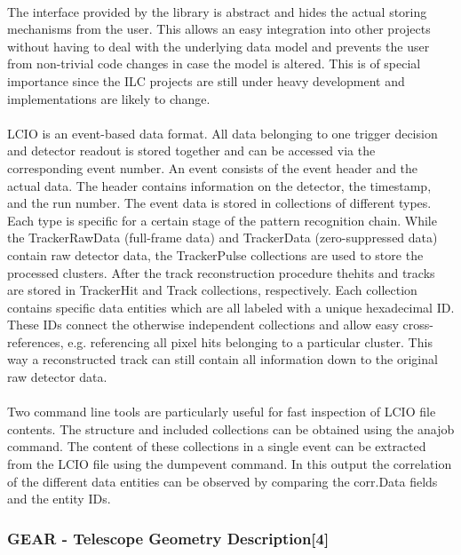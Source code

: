 \documentclass[11pt]{article}
\begin{document}
\paragraph{}
The interface provided by the library is abstract and hides the actual storing mechanisms from the user. This allows an easy integration into other projects without having to deal with the underlying data model and prevents the user from non-trivial code changes in case the model is altered. This is of special importance since the ILC projects are still under heavy development and implementations are likely to change.
\paragraph{}
LCIO is an event-based data format. All data belonging to one trigger decision and detector readout is stored together and can be accessed via the corresponding event number. An event consists of the event header and the actual data. The header contains information on the detector, the timestamp, and the run number. The event data is stored in collections of different types. Each type is specific for a certain stage of the pattern recognition chain. While the TrackerRawData (full-frame data) and TrackerData (zero-suppressed data) contain raw detector data, the TrackerPulse collections are used to store the processed clusters. After the track reconstruction procedure thehits and tracks are stored in TrackerHit and Track collections, respectively. Each collection contains specific data entities which are all labeled with a unique hexadecimal ID. These IDs connect the otherwise independent collections and allow easy cross-references, e.g. referencing all pixel hits belonging to a particular cluster. This way a reconstructed track can still contain all information down to the original raw detector data.
\paragraph{}
Two command line tools are particularly useful for fast inspection of LCIO file contents. The structure and included collections can be obtained using the anajob command. The content of these collections in a single event can be extracted from the LCIO file using the dumpevent command. In this output the correlation of the different data entities can be observed by comparing the corr.Data fields and the entity IDs.
\subsubsection{GEAR - Telescope Geometry Description[4]}
\end{document}
